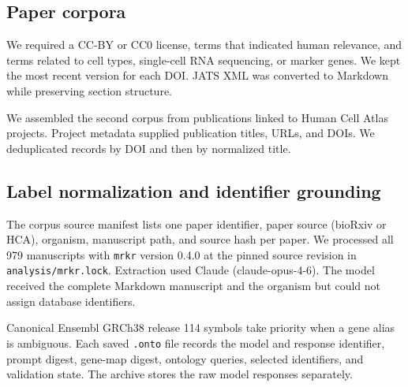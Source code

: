 \documentclass[10pt,twocolumn]{article}
\theoremstyle{plain}
\theoremstyle{definition}
\theoremstyle{remark}
\begin{document}
\subsection{Paper corpora}

 We required a CC-BY or CC0 license, terms that indicated human relevance, and terms related to cell types, single-cell RNA sequencing, or marker genes. We kept the most recent version for each DOI.  JATS XML was converted to Markdown while preserving section structure.

We assembled the second corpus from publications linked to Human Cell Atlas projects. Project metadata supplied publication titles, URLs, and DOIs. We deduplicated records by DOI and then by normalized title. 

\subsection{Label normalization and identifier grounding}

The corpus source manifest lists one paper identifier, paper source (bioRxiv or HCA), organism, manuscript path, and source hash per paper. We processed all 979 manuscripts with \texttt{mrkr} version 0.4.0 at the pinned source revision in \texttt{analysis/mrkr.lock}. Extraction used Claude (claude-opus-4-6). The model received the complete Markdown manuscript and the organism but could not assign database identifiers.

 Canonical Ensembl GRCh38 release 114 symbols take priority when a gene alias is ambiguous. Each saved \texttt{.onto} file records the model and response identifier, prompt digest, gene-map digest, ontology queries, selected identifiers, and validation state. The archive stores the raw model responses separately.
\end{document}
